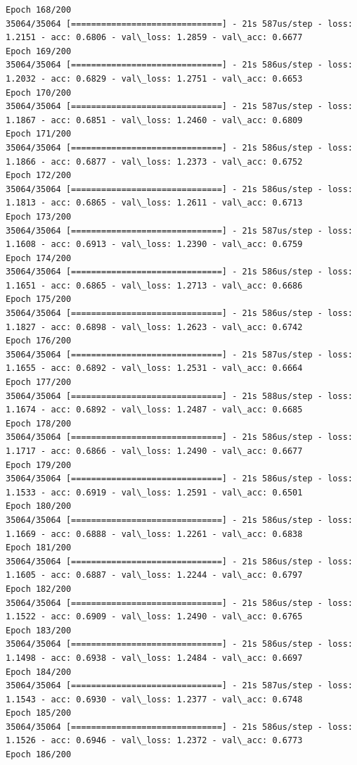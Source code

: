 \documentclass[11pt]{article}
\begin{document}
\begin{Verbatim}[commandchars=\\\{\}]
Epoch 168/200
35064/35064 [==============================] - 21s 587us/step - loss: 1.2151 - acc: 0.6806 - val\_loss: 1.2859 - val\_acc: 0.6677
Epoch 169/200
35064/35064 [==============================] - 21s 586us/step - loss: 1.2032 - acc: 0.6829 - val\_loss: 1.2751 - val\_acc: 0.6653
Epoch 170/200
35064/35064 [==============================] - 21s 587us/step - loss: 1.1867 - acc: 0.6851 - val\_loss: 1.2460 - val\_acc: 0.6809
Epoch 171/200
35064/35064 [==============================] - 21s 586us/step - loss: 1.1866 - acc: 0.6877 - val\_loss: 1.2373 - val\_acc: 0.6752
Epoch 172/200
35064/35064 [==============================] - 21s 586us/step - loss: 1.1813 - acc: 0.6865 - val\_loss: 1.2611 - val\_acc: 0.6713
Epoch 173/200
35064/35064 [==============================] - 21s 587us/step - loss: 1.1608 - acc: 0.6913 - val\_loss: 1.2390 - val\_acc: 0.6759
Epoch 174/200
35064/35064 [==============================] - 21s 586us/step - loss: 1.1651 - acc: 0.6865 - val\_loss: 1.2713 - val\_acc: 0.6686
Epoch 175/200
35064/35064 [==============================] - 21s 586us/step - loss: 1.1827 - acc: 0.6898 - val\_loss: 1.2623 - val\_acc: 0.6742
Epoch 176/200
35064/35064 [==============================] - 21s 587us/step - loss: 1.1655 - acc: 0.6892 - val\_loss: 1.2531 - val\_acc: 0.6664
Epoch 177/200
35064/35064 [==============================] - 21s 588us/step - loss: 1.1674 - acc: 0.6892 - val\_loss: 1.2487 - val\_acc: 0.6685
Epoch 178/200
35064/35064 [==============================] - 21s 586us/step - loss: 1.1717 - acc: 0.6866 - val\_loss: 1.2490 - val\_acc: 0.6677
Epoch 179/200
35064/35064 [==============================] - 21s 586us/step - loss: 1.1533 - acc: 0.6919 - val\_loss: 1.2591 - val\_acc: 0.6501
Epoch 180/200
35064/35064 [==============================] - 21s 586us/step - loss: 1.1669 - acc: 0.6888 - val\_loss: 1.2261 - val\_acc: 0.6838
Epoch 181/200
35064/35064 [==============================] - 21s 586us/step - loss: 1.1605 - acc: 0.6887 - val\_loss: 1.2244 - val\_acc: 0.6797
Epoch 182/200
35064/35064 [==============================] - 21s 586us/step - loss: 1.1522 - acc: 0.6909 - val\_loss: 1.2490 - val\_acc: 0.6765
Epoch 183/200
35064/35064 [==============================] - 21s 586us/step - loss: 1.1498 - acc: 0.6938 - val\_loss: 1.2484 - val\_acc: 0.6697
Epoch 184/200
35064/35064 [==============================] - 21s 587us/step - loss: 1.1543 - acc: 0.6930 - val\_loss: 1.2377 - val\_acc: 0.6748
Epoch 185/200
35064/35064 [==============================] - 21s 586us/step - loss: 1.1526 - acc: 0.6946 - val\_loss: 1.2372 - val\_acc: 0.6773
Epoch 186/200

\end{Verbatim}
\end{document}

